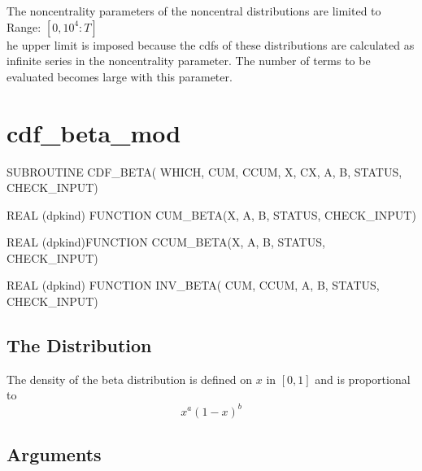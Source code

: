 \documentclass[12pt,dvips]{article}
\newcommand{\range}[2]{\hfill Range: \ensuremath{\left[ #1:#2
\right]}\\}
\newcommand{\mysection}[1]{\color{blue}
             \section{#1} \normalcolor}
\newcommand{\mysubsection}[1] {\color{green}
             \subsection{#1} \normalcolor}
\begin{document}
The  noncentrality  parameters  of  the noncentral  distributions  are
limited to\\
\range{0,10^4}
The upper  limit is imposed because the cdfs
of  these  distributions are  calculated  as  infinite  series in  the
noncentrality parameter.  The number  of terms to be evaluated becomes
large with this parameter.

\pagebreak

\mysection{cdf\_beta\_mod}

\begin{description}

\item SUBROUTINE CDF\_BETA( WHICH, CUM, CCUM, X, CX, A, B,
STATUS, CHECK\_INPUT)

\item    REAL   (dpkind)   FUNCTION    CUM\_BETA(X,
A, B, STATUS, CHECK\_INPUT)

\item    REAL    (dpkind)FUNCTION    CCUM\_BETA(X,
A, B, STATUS, CHECK\_INPUT)

\item  REAL (dpkind) FUNCTION  INV\_BETA(  CUM, CCUM,
A, B, STATUS, CHECK\_INPUT)

\end{description}

\mysubsection{The Distribution}

The density of the beta distribution is defined on $x$ in $[0,1]$ and
is proportional to
\[ x^a (1-x)^b \]

\mysubsection{Arguments}
\end{document}
